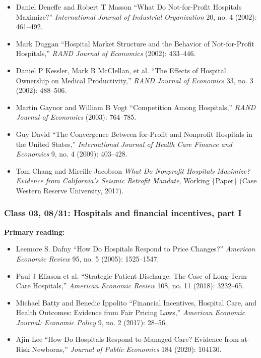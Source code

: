 \documentclass[11pt,]{article}
\providecommand{\tightlist}{%
  \setlength{\itemsep}{0pt}\setlength{\parskip}{0pt}}
\begin{document}
\begin{itemize}
\item
  Daniel Deneffe and Robert T Masson {``What Do Not-for-Profit Hospitals
  Maximize?''} \emph{International Journal of Industrial Organization}
  20, no. 4 (2002): 461--492.
\item
  Mark Duggan {``Hospital Market Structure and the Behavior of
  Not-for-Profit Hospitals,''} \emph{RAND Journal of Economics} (2002):
  433--446.
\item
  Daniel P Kessler, Mark B McClellan, et al. {``The {Effects} of
  {Hospital} {Ownership} on {Medical} {Productivity},''} \emph{RAND
  Journal of Economics} 33, no. 3 (2002): 488--506.
\item
  Martin Gaynor and William B Vogt {``Competition Among {Hospitals},''}
  \emph{RAND Journal of Economics} (2003): 764--785.
\item
  Guy David {``The Convergence Between for-Profit and Nonprofit
  Hospitals in the {United} {States},''} \emph{International Journal of
  Health Care Finance and Economics} 9, no. 4 (2009): 403--428.
\item
  Tom Chang and Mireille Jacobson \emph{What Do {Nonprofit} {Hospitals}
  {Maximize}? {Evidence} from {California}'s {Seismic} {Retrofit}
  {Mandate}}, Working \{Paper\} (Case Western Reserve University, 2017).
\end{itemize}

\hypertarget{class-03-0831-hospitals-and-financial-incentives-part-i}{%
\subsubsection{Class 03, 08/31: Hospitals and financial incentives, part
I}\label{class-03-0831-hospitals-and-financial-incentives-part-i}}

\textbf{Primary reading:}

\begin{itemize}
\tightlist
\item
  Leemore S. Dafny {``How {Do} {Hospitals} {Respond} to {Price}
  {Changes}?''} \emph{American Economic Review} 95, no. 5 (2005):
  1525--1547.
\item
  Paul J Eliason et al. {``Strategic Patient Discharge: {The} Case of
  Long-Term Care Hospitals,''} \emph{American Economic Review} 108, no.
  11 (2018): 3232--65.
\item
  Michael Batty and Benedic Ippolito {``Financial Incentives, Hospital
  Care, and Health Outcomes: {Evidence} from Fair Pricing Laws,''}
  \emph{American Economic Journal: Economic Policy} 9, no. 2 (2017):
  28--56.
\item
  Ajin Lee {``How Do Hospitals Respond to Managed Care? {Evidence} from
  at-Risk Newborns,''} \emph{Journal of Public Economics} 184 (2020):
  104130.
\end{itemize}
\end{document}
